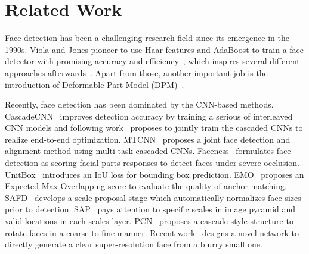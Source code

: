 \documentclass[letterpaper]{article} \usepackage{aaai19m}  \usepackage{times}  \usepackage{helvet}  \usepackage{courier}  \usepackage{url}  \usepackage{graphicx}  \usepackage{subfigure}
\begin{document}
\section{Related Work}
Face detection has been a challenging research field since its emergence in the 1990s. Viola and Jones pioneer to use Haar features and AdaBoost to train a face detector with promising accuracy and efficiency~\cite{DBLP:journals/ijcv/ViolaJ04}, which inspires several different approaches afterwards~\cite{DBLP:journals/pami/LiaoJL16,DBLP:journals/ijcv/BrubakerWSMR08,DBLP:conf/iccv/PhamC07}. Apart from those, another important job is the introduction of Deformable Part Model (DPM)~\cite{DBLP:conf/eccv/MathiasBPG14,DBLP:conf/cvpr/YanLWL14,DBLP:conf/cvpr/ZhuR12}. 

Recently, face detection has been dominated by the CNN-based methods. 
CascadeCNN~\cite{DBLP:conf/cvpr/LiLSBH15} improves detection accuracy by training a serious of interleaved CNN models and following work~\cite{DBLP:conf/cvpr/QinYLH16} proposes to jointly train the cascaded CNNs to realize end-to-end optimization. MTCNN~\cite{DBLP:journals/spl/ZhangZLQ16} proposes a joint face detection and alignment method using multi-task cascaded CNNs. Faceness~\cite{DBLP:conf/iccv/YangLLT15} formulates face detection as scoring facial parts responses to detect faces under severe occlusion. UnitBox~\cite{DBLP:conf/mm/YuJWCH16} introduces an IoU loss for bounding box prediction. EMO~\cite{zhu2018seeing} proposes an Expected Max Overlapping score to evaluate the quality of anchor matching. SAFD~\cite{hao2017scale} develops a scale proposal stage which automatically normalizes face sizes prior to detection. SAP~\cite{song2018beyond} pays attention to specific scales in image pyramid and valid locations in each scales layer. PCN~\cite{shi2018real} proposes a cascade-style structure to rotate faces in a coarse-to-fine manner. Recent work~\cite{bai2018finding} designs a novel network to directly generate a clear super-resolution face from a blurry small one.
\end{document}
